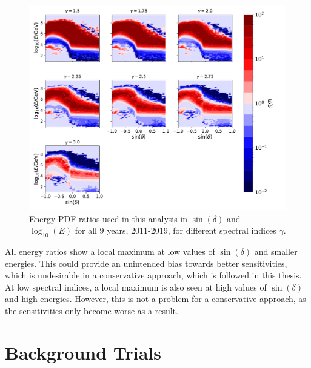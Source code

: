 \begin{figure}[H]
    \centering
    \includegraphics[width=\linewidth]{Plots/05_csky/energy_pdf_ratio.pdf}
    \caption{Energy PDF ratios used in this analysis in $\sin{(\delta)}$ and $\log_{10}{(E)}$ for all $\num{9}$ years, 2011-2019, for different spectral indices $\gamma$.}
    \label{fig:energy_ratio_time_int}
\end{figure}

All energy ratios show a local maximum at low values of $\sin{(\delta)}$ and smaller energies.
This could provide an unintended bias towards better sensitivities, which is undesirable in a conservative approach, which is followed in this thesis.
At low spectral indices, a local maximum is also seen at high values of $\sin{(\delta)}$ and high energies.
However, this is not a problem for a conservative approach, as the sensitivities only become worse as a result.

\section{Background Trials}


